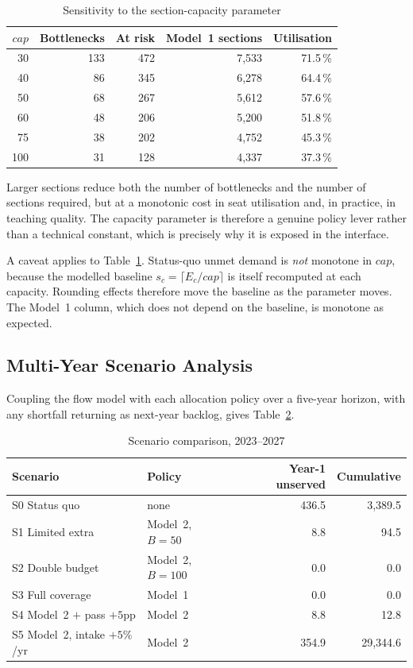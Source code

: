 \documentclass[conference]{IEEEtran}
\begin{document}
\begin{table}[htbp]
\caption{Sensitivity to the section-capacity parameter}
\label{tab:capacity}
\centering
\small
\begin{tabular}{rrrrr}
\toprule
$cap$ & Bottlenecks & At risk & Model~1 sections & Utilisation \\
\midrule
30  & 133 & 472 & 7{,}533 & 71.5\,\% \\
40  & 86  & 345 & 6{,}278 & 64.4\,\% \\
50  & 68  & 267 & 5{,}612 & 57.6\,\% \\
60  & 48  & 206 & 5{,}200 & 51.8\,\% \\
75  & 38  & 202 & 4{,}752 & 45.3\,\% \\
100 & 31  & 128 & 4{,}337 & 37.3\,\% \\
\bottomrule
\end{tabular}
\end{table}

Larger sections reduce both the number of bottlenecks and the number of sections
required, but at a monotonic cost in seat utilisation and, in practice, in teaching
quality. The capacity parameter is therefore a genuine policy lever rather than a
technical constant, which is precisely why it is exposed in the interface.

A caveat applies to Table~\ref{tab:capacity}. Status-quo unmet demand is \emph{not}
monotone in $cap$, because the modelled baseline $s_c = \lceil E_c / cap \rceil$ is
itself recomputed at each capacity. Rounding effects therefore move the baseline as the
parameter moves. The Model~1 column, which does not depend on the baseline, is monotone
as expected.

\subsection{Multi-Year Scenario Analysis}

Coupling the flow model with each allocation policy over a five-year horizon, with any
shortfall returning as next-year backlog, gives Table~\ref{tab:scen}.

\begin{table}[htbp]
\caption{Scenario comparison, 2023--2027}
\label{tab:scen}
\centering
\small
\begin{tabular}{llrr}
\toprule
Scenario & Policy & Year-1 unserved & Cumulative \\
\midrule
S0 Status quo              & none     & 436.5 & 3{,}389.5 \\
S1 Limited extra           & Model~2, $B{=}50$  & 8.8 & 94.5 \\
S2 Double budget           & Model~2, $B{=}100$ & 0.0 & 0.0 \\
S3 Full coverage           & Model~1  & 0.0 & 0.0 \\
S4 Model~2 $+$ pass $+5$pp & Model~2  & 8.8 & 12.8 \\
S5 Model~2, intake $+5\%$/yr & Model~2 & 354.9 & 29{,}344.6 \\
\bottomrule
\end{tabular}
\end{table}
\end{document}
